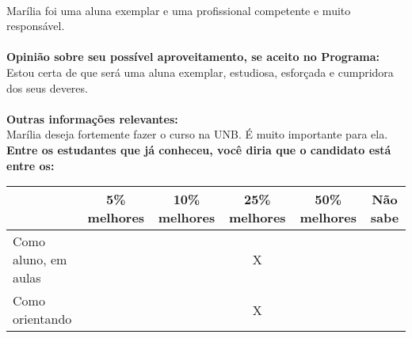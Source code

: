 \documentclass[11pt]{article}
\begin{document}
\\Marília foi uma aluna exemplar e uma profissional competente e muito responsável.\\
\\
\textbf{Opinião sobre seu possível aproveitamento, se aceito no Programa:}
\\Estou certa de que será uma aluna exemplar, estudiosa, esforçada e cumpridora dos seus deveres.\\ 
\\
\textbf{Outras informações relevantes:} \\Marília deseja fortemente fazer o curso na UNB. É muito importante para ela.
\\[0.3cm]
\textbf{Entre os estudantes que já conheceu, você diria que o candidato está entre os:}
\\
\begin{tabular}{|l|c|c|c|c|c|}
\hline
 & 5\% melhores & 10\% melhores & 25\% melhores & 50\% melhores & Não sabe \\
\hline
Como aluno, em aulas &  &  & X &  & \\
\hline
Como orientando &  &  & X &  & \\
\hline
\end{tabular}
\end{document}
